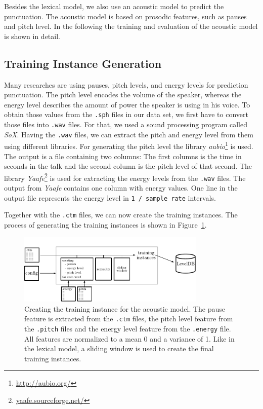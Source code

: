 Besides the lexical model, we also use an acoustic model to predict the punctuation.
The acoustic model is based on prosodic features, such as pauses and pitch level.
In the following the training and evaluation of the acoustic model is shown in detail.

\subsection{Training Instance Generation}

Many researches are using pauses, pitch levels, and energy levels for prediction punctuation.
The pitch level encodes the volume of the speaker, whereas the energy level describes the amount of power the speaker is using in his voice.
To obtain those values from the \texttt{.sph} files in our data set, we first have to convert those files into \texttt{.wav} files.
For that, we used a sound processing program called \emph{SoX}.
Having the \texttt{.wav} files, we can extract the pitch and energy level from them using different libraries.
For generating the pitch level the library \emph{aubio}\footnote{\url{http://aubio.org/}} is used.
The output is a file containing two columns: The first columns is the time in seconds in the talk and the second column is the pitch level of that second.
The library \emph{Yaafe}\footnote{\url{yaafe.sourceforge.net/}} is used for extracting the energy levels from the \texttt{.wav} files.
The output from \emph{Yaafe} contains one column with energy values.
One line in the output file represents the energy level in \texttt{1 / sample rate} intervals.

Together with the \texttt{.ctm} files, we can now create the training instances.
The process of generating the training instances is shown in Figure~\ref{fig:overview_acoustic}.

\begin{figure}[ht]
    \centering
    \includegraphics[width=0.8\textwidth]{img/overview_accoustic.pdf}
    \caption{Creating the training instance for the acoustic model. The pause feature is extracted from the \texttt{.ctm} files, the pitch level feature from the \texttt{.pitch} files and the energy level feature from the \texttt{.energy} file. All features are normalized to a mean 0 and a variance of 1. Like in the lexical model, a sliding window is used to create the final training instances.}
    \label{fig:overview_acoustic}
\end{figure}

